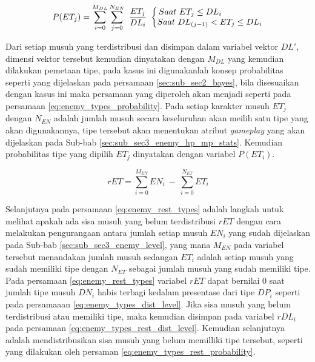 \begin{equation}\label{eq:enemy_types_probability}
P(ET_{j}) = \sum_{i = 0}^{M_{DL}} \sum_{j = 0}^{N_{EN}}\ \frac{ET_{j}}{DL_{i}}\
\left\{\begin{matrix}
\hspace{-4.6em} Saat\ ET_{j} \leq DL_{i} \\ 
Saat\ DL_{(j-1)} < ET_{j} \leq DL_{i}
\end{matrix}\right.
\end{equation}

Dari setiap musuh yang terdistribusi dan disimpan dalam variabel vektor $DL'$, dimensi vektor tersebut kemudian dinyatakan dengan $M_{DL}$ yang kemudian dilakukan pemetaan tipe, pada kasus ini digunakanlah konsep probabilitas seperti yang dijelaskan pada persamaan \ref{sec:sub_sec2_bayes}, bila disesuaikan dengan kasus ini maka persamaan yang diperoleh akan menjadi seperti pada persamaan \ref{eq:enemy_types_probability}. Pada setiap karakter musuh $ET_{j}$ dengan $N_{EN}$ adalah jumlah musuh secara keseluruhan akan meilih satu tipe yang akan digunakannya, tipe tersebut akan menentukan atribut \textit{gameplay} yang akan dijelaskan pada Sub-bab \ref{sec:sub_sec3_enemy_hp_mp_stats}. Kemudian probabilitas tipe yang dipilih $ET_{j}$ dinyatakan dengan variabel $P(ET_{i})$.
\vspace{1ex}

\begin{equation}\label{eq:enemy_rest_types}
rET = \sum_{i = 0}^{M_{EN}} EN_{i}\ -\ \sum_{i = 0}^{N_{ET}} ET_{i}
\end{equation}

Selanjutnya pada persamaan \ref{eq:enemy_rest_types} adalah langkah untuk melihat apakah ada sisa musuh yang belum terdistribusi $rET$ dengan cara melakukan pengurangaan antara jumlah setiap musuh $EN_{i}$ yang sudah dijelaskan pada Sub-bab \ref{sec:sub_sec3_enemy_level}, yang mana $M_{EN}$ pada variabel tersebut menandakan jumlah musuh sedangan $ET_{i}$ adalah setiap musuh yang sudah memiliki tipe dengan $N_{ET}$ sebagai jumlah musuh yang sudah memiliki tipe. Pada persamaan \ref{eq:enemy_rest_types} variabel $rET$ dapat bernilai 0 saat jumlah tipe musuh $DN_{i}$ habis terbagi kedalam presentase dari tipe $DP_{i}$ seperti pada persamaaan \ref{eq:enemy_types_dist_level}. Jika sisa musuh yang belum terdistribusi atau memiliki tipe, maka kemudian disimpan pada variabel $rDL_{i}$ pada persamaan \ref{eq:enemy_types_rest_dist_level}. Kemudian selanjutnya adalah mendistribusikan sisa musuh yang belum memilliki tipe tersebut, seperti yang dilakukan oleh persaman \ref{eq:enemy_types_rest_probability}.
\vspace{1ex}

